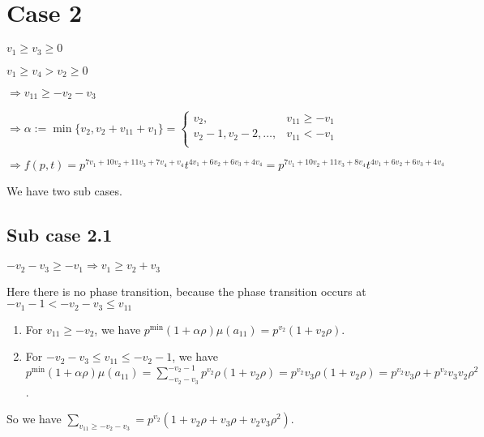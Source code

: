 \documentclass{article}
\begin{document}
\section{Case 2}
$v_1\geq{v_3}\geq{0}$

$v_1\geq{v_4}>v_2\geq{0}$

$\Rightarrow{v_{11}}\geq{-v_2-v_3}$

$\Rightarrow\alpha:=\min\{v_2,v_2+v_{11}+v_1\}=\begin{cases}
       v_2, & v_{11}\geq{-v_1}\\
       v_2-1,v_2-2,\dots, & v_{11}<{-v_1}\\
     \end{cases}$

     $\Rightarrow{f(p,t)=p^{7v_1+10v_2+11v_3+7v_4+v_4}t^{4v_1+6v_2+6v_3+4v_4}=p^{7v_1+10v_2+11v_3+8v_4}t^{4v_1+6v_2+6v_3+4v_4}}$

We have two sub cases.
\subsection{Sub case 2.1}
$-v_2-v_3\geq{-v_1}\Rightarrow{v_1\geq{v_2+v_3}}$

Here there is no phase transition, because the phase transition occurs at $-v_1-1<{-v_2-v_3}\leq{v_{11}}$
\begin{enumerate}
    \item 
For $v_{11}\geq{-v_2}$, we have $p^{\min}(1+\alpha\rho)\mu(a_{11})=p^{v_2}(1+v_2\rho)$.
\item 
For $-v_2-v_3\leq{v_{11}}\leq{-v_2-1}$, we have $p^{\min}(1+\alpha\rho)\mu(a_{11})=\sum_{-v_2-v_3}^{-v_2-1}p^{v_2}\rho(1+v_2\rho)=p^{v_2}v_3\rho(1+v_2\rho)=p^{v_2}v_3\rho+p^{v_2}v_3v_2\rho^2$.
\end{enumerate}
So we have $\sum_{v_{11}\geq{-v_2-v_3}}=p^{v_2}(1+v_2\rho+v_3\rho+v_2v_3\rho^2).$
\end{document}
